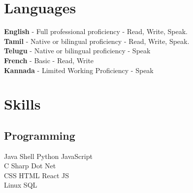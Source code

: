 \documentclass[]{deedy-resume-openfont}
\begin{document}
\begin{minipage}[t]{0.33\textwidth}

\section{Languages}
\textbf{English} - Full professional proficiency - Read, Write, Speak. \\
\vspace{\topsep}
\textbf{Tamil} - Native or bilingual proficiency -  Read, Write, Speak. \\
\vspace{\topsep}
\textbf{Telugu} - Native or bilingual proficiency -  Speak \\
\vspace{\topsep}
\textbf{French} - Basic - Read, Write \\
\vspace{\topsep}
\textbf{Kannada} - Limited Working Proficiency - Speak \\


\section{Skills}
\subsection{Programming}
\textbullet{} Java \textbullet{} Shell \textbullet{} Python \textbullet{} JavaScript \\
\textbullet{} C Sharp \textbullet{} Dot Net \\
\textbullet{} CSS \textbullet{} HTML \textbullet{} React JS \\
\textbullet{} Linux \textbullet{} SQL
\sectionsep

%
%

\end{minipage} 
\hfill
\end{document}
